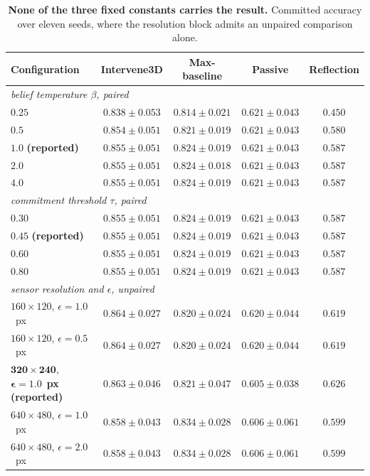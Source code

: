 \documentclass{article} %
\theoremstyle{defstyle}
\theoremstyle{plain}
\begin{document}
\begin{table}[!ht]
\caption{\textbf{None of the three fixed constants carries the result.} Committed accuracy over eleven
seeds, where the resolution block admits an unpaired comparison alone.}
\label{tab:supp-hyper}
\begin{center}
\footnotesize
\begin{tabular}{lcccc}
\toprule
\textbf{Configuration} & \textbf{Intervene3D} & \textbf{Max-baseline} &
\textbf{Passive} & \textbf{Reflection} \\
\midrule
\multicolumn{5}{l}{\emph{belief temperature $\beta$, paired}} \\
$0.25$ & $0.838 \pm 0.053$ & $0.814 \pm 0.021$ & $0.621 \pm 0.043$ & $0.450$ \\
$0.5$  & $0.854 \pm 0.051$ & $0.821 \pm 0.019$ & $0.621 \pm 0.043$ & $0.580$ \\
$\mathbf{1.0}$ \textbf{(reported)} & $\mathbf{0.855 \pm 0.051}$ & $0.824 \pm 0.019$ & $0.621 \pm 0.043$ & $0.587$ \\
$2.0$  & $0.855 \pm 0.051$ & $0.824 \pm 0.018$ & $0.621 \pm 0.043$ & $0.587$ \\
$4.0$  & $0.855 \pm 0.051$ & $0.824 \pm 0.019$ & $0.621 \pm 0.043$ & $0.587$ \\
\midrule
\multicolumn{5}{l}{\emph{commitment threshold $\tau$, paired}} \\
$0.30$ & $0.855 \pm 0.051$ & $0.824 \pm 0.019$ & $0.621 \pm 0.043$ & $0.587$ \\
$\mathbf{0.45}$ \textbf{(reported)} & $\mathbf{0.855 \pm 0.051}$ & $0.824 \pm 0.019$ & $0.621 \pm 0.043$ & $0.587$ \\
$0.60$ & $0.855 \pm 0.051$ & $0.824 \pm 0.019$ & $0.621 \pm 0.043$ & $0.587$ \\
$0.80$ & $0.855 \pm 0.051$ & $0.824 \pm 0.019$ & $0.621 \pm 0.043$ & $0.587$ \\
\midrule
\multicolumn{5}{l}{\emph{sensor resolution and $\epsilon$, unpaired}} \\
$160 \times 120$, $\epsilon = 1.0$~px & $0.864 \pm 0.027$ & $0.820 \pm 0.024$ & $0.620 \pm 0.044$ & $0.619$ \\
$160 \times 120$, $\epsilon = 0.5$~px & $0.864 \pm 0.027$ & $0.820 \pm 0.024$ & $0.620 \pm 0.044$ & $0.619$ \\
$\mathbf{320 \times 240}$, $\boldsymbol{\epsilon = 1.0}$~\textbf{px (reported)} & $\mathbf{0.863 \pm 0.046}$ & $0.821 \pm 0.047$ & $0.605 \pm 0.038$ & $0.626$ \\
$640 \times 480$, $\epsilon = 1.0$~px & $0.858 \pm 0.043$ & $0.834 \pm 0.028$ & $0.606 \pm 0.061$ & $0.599$ \\
$640 \times 480$, $\epsilon = 2.0$~px & $0.858 \pm 0.043$ & $0.834 \pm 0.028$ & $0.606 \pm 0.061$ & $0.599$ \\
\bottomrule
\end{tabular}
\end{center}
\end{table}
\end{document}
